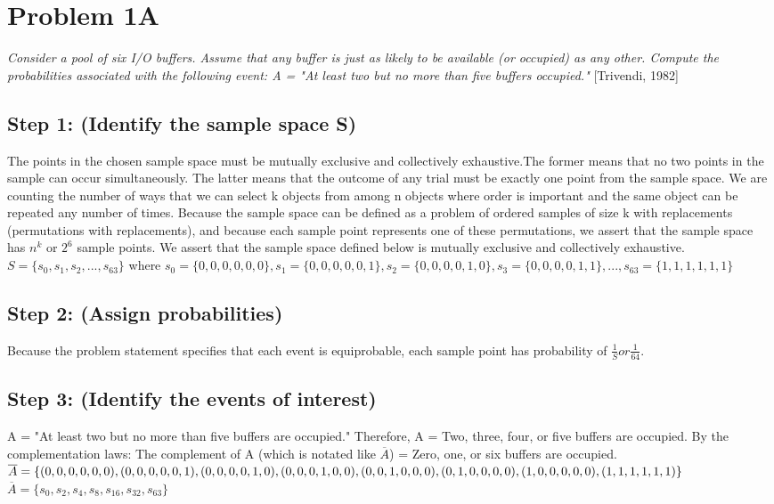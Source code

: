 \documentclass[a4paper,10pt]{article}
\title{}
\author{Mark Johnson \\
Loyola University Chicago}
\date {mjohnson4@luc.edu}
\begin{document}
\maketitle
\section{Problem 1A}
\emph{Consider a pool of six I/O buffers. Assume that any buffer is just as likely to be available (or occupied) as 
any other. Compute the probabilities associated with the following event: \newline
A = "At least two but no more than five buffers occupied."} [Trivendi, 1982]
\subsection{Step 1: (Identify the sample space S)}
The points in the chosen sample space must be mutually exclusive and collectively exhaustive.The former means that no 
two points in the sample can occur simultaneously. The latter means that the outcome of any trial must be exactly one 
point from the sample space. We are counting the number of ways that we can select k objects from among n objects 
where order is important and the same object can be repeated any number of times. Because the sample space can be 
defined as a problem of ordered samples of size k with replacements (permutations with replacements), and because 
each sample point represents one of these permutations, we assert that the sample space has $ n^{k} $ or $ 2^{6} $ 
sample points. We assert that the sample space defined below is mutually exclusive and collectively exhaustive. 
\newline
$ S = \{s_{0}, s_{1}, s_{2},..., s_{63}\} $ where \newline
$ s_{0} = \{0,0,0,0,0,0\}, s_{1} = \{0,0,0,0,0,1\}, s_{2} = \{0,0,0,0,1,0\}, s_{3} = \{0,0,0,0,1,1\},..., s_{63} = 
\{1,1,1,1,1,1\} $
\subsection{Step 2: (Assign probabilities)}
Because the problem statement specifies that each event is equiprobable, each sample point has probability of $ 
\frac{1}{S} or \frac{1}{64}. $
\subsection{Step 3: (Identify the events of interest)}
A = "At least two but no more than five buffers are occupied." \newline
Therefore, A = Two, three, four, or five buffers are occupied. \newline
By the complementation laws: \newline
The complement of A (which is notated like $ \overline{A} $) = Zero, one, or six buffers are 
occupied. \newline
$ \overline{A} = \{(0,0,0,0,0,0), (0,0,0,0,0,1), (0,0,0,0,1,0), \newline
 (0,0,0,1,0,0), (0,0,1,0,0,0), (0,1,0,0,0,0), (1,0,0,0,0,0), (1,1,1,1,1,1)\} $ \newline
$ \overline{A} = \{s_{0}, s_{2}, s_{4}, s_{8}, s_{16}, s_{32}, s_{63}\} $
\end{document}
